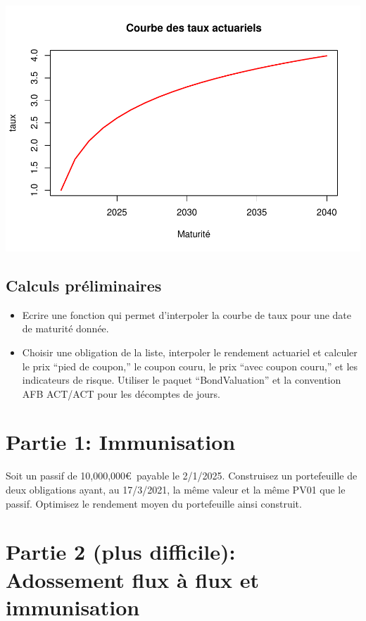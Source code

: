 \documentclass[
]{article}
\providecommand{\tightlist}{%
  \setlength{\itemsep}{0pt}\setlength{\parskip}{0pt}}
\begin{document}
\includegraphics{TP-8_files/figure-latex/unnamed-chunk-2-1.pdf}

\hypertarget{calculs-pruxe9liminaires}{%
\subsection{Calculs préliminaires}\label{calculs-pruxe9liminaires}}

\begin{itemize}
\tightlist
\item
  Ecrire une fonction qui permet d'interpoler la courbe de taux pour une
  date de maturité donnée.
\item
  Choisir une obligation de la liste, interpoler le rendement actuariel
  et calculer le prix ``pied de coupon,'' le coupon couru, le prix
  ``avec coupon couru,'' et les indicateurs de risque. Utiliser le
  paquet ``BondValuation'' et la convention AFB ACT/ACT pour les
  décomptes de jours.
\end{itemize}

\hypertarget{partie-1-immunisation}{%
\section{Partie 1: Immunisation}\label{partie-1-immunisation}}

Soit un passif de 10,000,000\euro~payable le 2/1/2025. Construisez un
portefeuille de deux obligations ayant, au 17/3/2021, la même valeur et
la même PV01 que le passif. Optimisez le rendement moyen du portefeuille
ainsi construit.

\hypertarget{partie-2-plus-difficile-adossement-flux-uxe0-flux-et-immunisation}{%
\section{Partie 2 (plus difficile): Adossement flux à flux et
immunisation}\label{partie-2-plus-difficile-adossement-flux-uxe0-flux-et-immunisation}}
\end{document}
